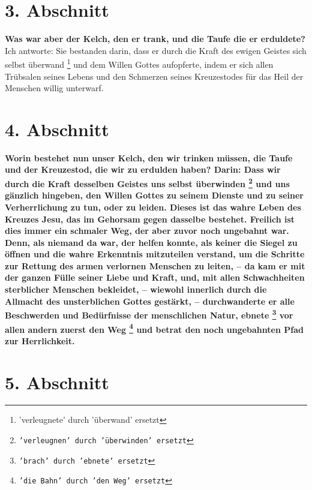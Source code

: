\section{3. Abschnitt} \label{kap4_ab3}

 
\textbf{Was war aber der Kelch, den er trank, und die Taufe die er erduldete?}
Ich
antworte: Sie bestanden darin, dass er durch die Kraft des ewigen Geistes sich
selbst überwand \footnote{'verleugnete' durch 'überwand' ersetzt} und dem
Willen Gottes aufopferte, indem er sich allen
Trübsalen seines Lebens und den Schmerzen seines Kreuzestodes für das Heil der
Menschen willig unterwarf.

\section{4. Abschnitt} \label{kap4_ab4}

 
\textbf{Worin bestehet nun unser Kelch, den wir trinken müssen, die Taufe und
der
Kreuzestod, die wir zu erdulden haben? Darin: Dass wir durch die Kraft desselben
Geistes uns selbst überwinden \footnote{\texttt{'verleugnen' durch 'überwinden'
ersetzt}} und uns gänzlich hingeben, den Willen Gottes zu
seinem Dienste und zu seiner Verherrlichung zu tun, oder zu leiden. Dieses ist
das wahre Leben des Kreuzes Jesu, das im Gehorsam gegen dasselbe bestehet.
Freilich ist dies immer ein schmaler Weg, der aber zuvor noch ungebahnt war. Denn, als
niemand da war, der helfen konnte, als keiner die Siegel  zu
öffnen und die wahre
Erkenntnis mitzuteilen verstand, um die Schritte zur Rettung des armen
verlornen Menschen zu leiten, -- da kam er mit der ganzen Fülle seiner Liebe und
Kraft, und, mit allen Schwachheiten sterblicher Menschen bekleidet, -- wiewohl
innerlich durch die Allmacht  des unsterblichen Gottes
gestärkt, -- durchwanderte
er alle Beschwerden und Bedürfnisse der menschlichen Natur, ebnete
\footnote{\texttt{'brach' durch 'ebnete' ersetzt}} vor allen
andern zuerst den Weg \footnote{\texttt{'die Bahn' durch 'den Weg' ersetzt}} und
betrat den noch ungebahnten Pfad zur Herrlichkeit.}

\section{5. Abschnitt} \label{kap4_ab5}

